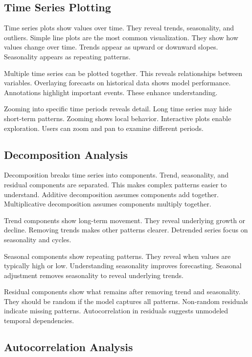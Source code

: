 \subsection{Time Series Plotting}

Time series plots show values over time. They reveal trends, seasonality, and outliers. Simple line plots are the most common visualization. They show how values change over time. Trends appear as upward or downward slopes. Seasonality appears as repeating patterns.

Multiple time series can be plotted together. This reveals relationships between variables. Overlaying forecasts on historical data shows model performance. Annotations highlight important events. These enhance understanding.

Zooming into specific time periods reveals detail. Long time series may hide short-term patterns. Zooming shows local behavior. Interactive plots enable exploration. Users can zoom and pan to examine different periods.

\subsection{Decomposition Analysis}

Decomposition breaks time series into components. Trend, seasonality, and residual components are separated. This makes complex patterns easier to understand. Additive decomposition assumes components add together. Multiplicative decomposition assumes components multiply together.

Trend components show long-term movement. They reveal underlying growth or decline. Removing trends makes other patterns clearer. Detrended series focus on seasonality and cycles.

Seasonal components show repeating patterns. They reveal when values are typically high or low. Understanding seasonality improves forecasting. Seasonal adjustment removes seasonality to reveal underlying trends.

Residual components show what remains after removing trend and seasonality. They should be random if the model captures all patterns. Non-random residuals indicate missing patterns. Autocorrelation in residuals suggests unmodeled temporal dependencies.

\subsection{Autocorrelation Analysis}

